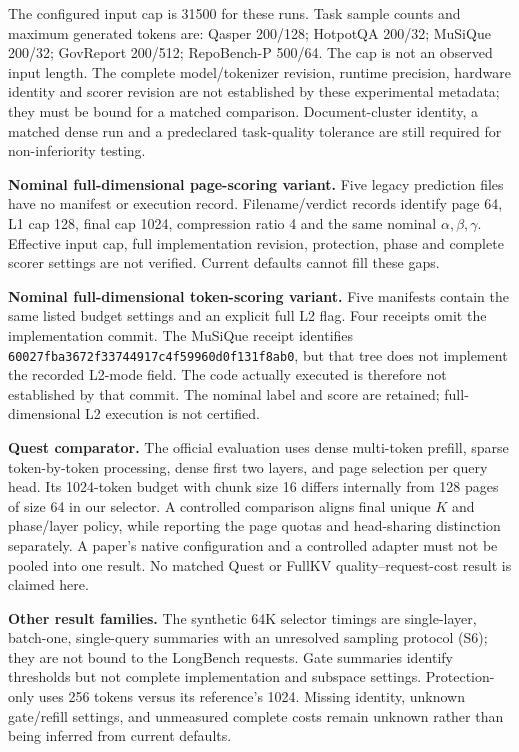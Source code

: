 \documentclass[10pt,letterpaper]{article}
\begin{document}
The configured input cap is 31500 for these runs. Task sample counts and maximum generated tokens are: Qasper 200/128; HotpotQA 200/32; MuSiQue 200/32; GovReport 200/512; RepoBench-P 500/64. The cap is not an observed input length. The complete model/tokenizer revision, runtime precision, hardware identity and scorer revision are not established by these experimental metadata; they must be bound for a matched comparison. Document-cluster identity, a matched dense run and a predeclared task-quality tolerance are still required for non-inferiority testing.

\textbf{Nominal full-dimensional page-scoring variant.} Five legacy prediction files have no manifest or execution record. Filename/verdict records identify page 64, L1 cap 128, final cap 1024, compression ratio 4 and the same nominal $\alpha,\beta,\gamma$. Effective input cap, full implementation revision, protection, phase and complete scorer settings are not verified. Current defaults cannot fill these gaps.

\textbf{Nominal full-dimensional token-scoring variant.} Five manifests contain the same listed budget settings and an explicit full L2 flag. Four receipts omit the implementation commit. The MuSiQue receipt identifies \texttt{60027fba\allowbreak{}3672f337\allowbreak{}44917c4f\allowbreak{}59960d0f\allowbreak{}131f8ab0}, but that tree does not implement the recorded L2-mode field. The code actually executed is therefore not established by that commit. The nominal label and score are retained; full-dimensional L2 execution is not certified.

\textbf{Quest comparator.} The official evaluation uses dense multi-token prefill, sparse token-by-token processing, dense first two layers, and page selection per query head. Its 1024-token budget with chunk size 16 differs internally from 128 pages of size 64 in our selector. A controlled comparison aligns final unique $K$ and phase/layer policy, while reporting the page quotas and head-sharing distinction separately. A paper's native configuration and a controlled adapter must not be pooled into one result. No matched Quest or FullKV quality--request-cost result is claimed here.

\textbf{Other result families.} The synthetic 64K selector timings are single-layer, batch-one, single-query summaries with an unresolved sampling protocol (S6); they are not bound to the LongBench requests. Gate summaries identify thresholds but not complete implementation and subspace settings. Protection-only uses 256 tokens versus its reference's 1024. Missing identity, unknown gate/refill settings, and unmeasured complete costs remain unknown rather than being inferred from current defaults.
\end{document}
